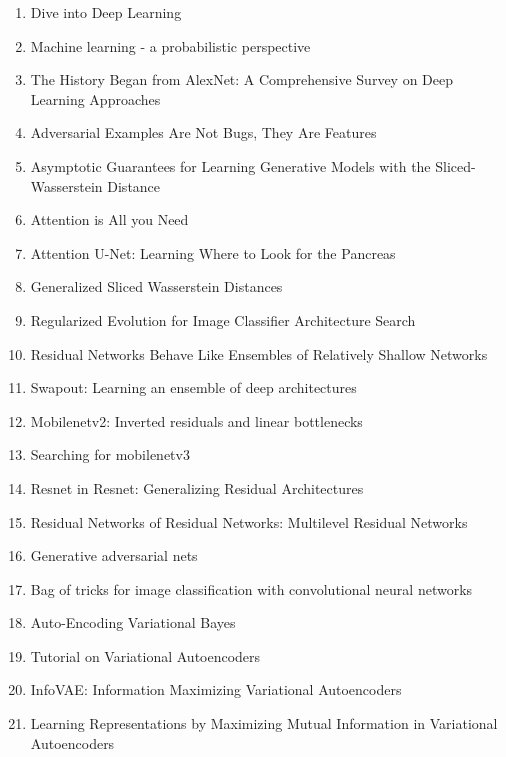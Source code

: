 \documentclass[acmlarge]{acmart}
\begin{document}
\begin{enumerate}
	\item Dive into Deep Learning \cite{zhang2020dive}
	\item Machine learning - a probabilistic perspective \cite{Murphy2012MachineL}
	\item The History Began from AlexNet: A Comprehensive Survey on Deep Learning Approaches \cite{Alom2018TheHB}
	\item Adversarial Examples Are Not Bugs, They Are Features \cite{Ilyas2019AdversarialEA}
	\item Asymptotic Guarantees for Learning Generative Models with the Sliced-Wasserstein Distance \cite{Nadjahi2019AsymptoticGF}
	\item Attention is All you Need \cite{Vaswani2017AttentionIA}
	\item Attention U-Net: Learning Where to Look for the Pancreas \cite{Oktay2018AttentionUL}
	\item Generalized Sliced Wasserstein Distances \cite{Kolouri2019GeneralizedSW}
	\item Regularized Evolution for Image Classifier Architecture Search \cite{Real2019RegularizedEF}
	\item Residual Networks Behave Like Ensembles of Relatively Shallow Networks \cite{Veit2016ResidualNB}
	\item Swapout: Learning an ensemble of deep architectures \cite{Singh2016SwapoutLA}
	\item Mobilenetv2: Inverted residuals and linear bottlenecks \cite{sandler2018mobilenetv2}
	\item Searching for mobilenetv3 \cite{howard2019searching}
	\item Resnet in Resnet: Generalizing Residual Architectures \cite{Targ2016ResnetIR}
	\item Residual Networks of Residual Networks: Multilevel Residual Networks \cite{Zhang2018ResidualNO}
	\item Generative adversarial nets \cite{goodfellow2014generative}
	\item Bag of tricks for image classification with convolutional neural networks \cite{he2019bag}
	\item Auto-Encoding Variational Bayes \cite{Kingma2014AutoEncodingVB}
	\item Tutorial on Variational Autoencoders \cite{Doersch2016TutorialOV}
	\item InfoVAE: Information Maximizing Variational Autoencoders \cite{zhao2017infovae}
	\item Learning Representations by Maximizing Mutual Information in Variational Autoencoders \cite{LotfiRezaabad2020LearningRB}

\end{enumerate}
\end{document}
